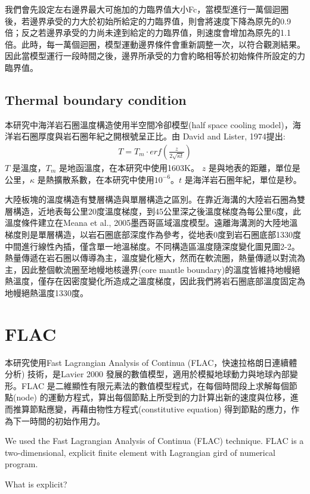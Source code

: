 我們會先設定左右邊界最大可施加的力臨界值大小Fc，當模型進行一萬個迴圈後，若邊界承受的力大於初始所給定的力臨界值，則會將速度下降為原先的0.9倍；反之若邊界承受的力尚未達到給定的力臨界值，則速度會增加為原先的1.1倍。此時，每一萬個迴圈，模型運動邊界條件會重新調整一次，以符合觀測結果。因此當模型運行一段時間之後，邊界所承受的力會約略相等於初始條件所設定的力臨界值。

\subsection{Thermal boundary condition}
本研究中海洋岩石圈溫度構造使用半空間冷卻模型(half space cooling model)，海洋岩石圈厚度與岩石圈年紀之開根號呈正比。由 David and Lister, 1974提出:
\begin{align}
T=T_m\cdot {erf}(\frac{z}{2\sqrt{\kappa t}})
\end{align}
$T$ 是溫度，$T_m$ 是地函溫度，在本研究中使用1603K。
$z$ 是與地表的距離，單位是公里，$\kappa$ 是熱擴散系數，在本研究中使用$10^{-6}$。$t$ 是海洋岩石圈年紀，單位是秒。

大陸板塊的溫度構造有雙層構造與單層構造之區別。在靠近海溝的大陸岩石圈為雙層構造，近地表每公里20度溫度梯度，到45公里深之後溫度梯度為每公里6度，此溫度條件建立在Meana et al., 2005墨西哥區域溫度模型。遠離海溝測的大陸地溫梯度則是單層構造，以岩石圈底部深度作為參考，從地表0度到岩石圈底部1330度中間進行線性內插，僅含單一地溫梯度。不同構造區溫度隨深度變化圖見圖2-2。熱量傳遞在岩石圈以傳導為主，溫度變化極大，然而在軟流圈，熱量傳遞以對流為主，因此整個軟流圈至地幔地核邊界(core mantle boundary)的溫度皆維持地幔絕熱溫度，僅存在因密度變化所造成之溫度梯度，因此我們將岩石圈底部溫度固定為地幔絕熱溫度1330度。


\section{FLAC}

本研究使用Fast Lagrangian Analysis of Continua (FLAC，快速拉格朗日連續體分析) 技術，是Lavier 2000 發展的數值模型，適用於模擬地球動力與地球內部變形。FLAC 是二維顯性有限元素法的數值模型程式，在每個時間段上求解每個節點(node) 的運動方程式，算出每個節點上所受到的力計算出新的速度與位移，進
而推算節點應變，再藉由物性方程式(constitutive equation) 得到節點的應力，作為下一時間的初始作用力。

We used the Fast Lagrangian Analysis of Continua (FLAC) technique. FLAC is a two-dimensional, explicit finite element with Lagrangian gird of numerical program.

What is explicit?

